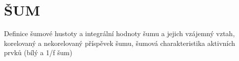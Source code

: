 \section{ŠUM}
Definice šumové hustoty a integrální hodnoty šumu a jejich vzájemný vztah, korelovaný a nekorelovaný příspěvek šumu, šumová charakteristika aktivních prvků (bílý a 1/f šum)